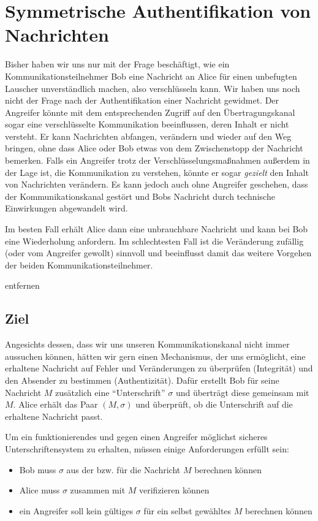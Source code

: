 \chapter{Symmetrische Authentifikation von Nachrichten}
\label{cha:symauth}

Bisher haben wir uns nur mit der Frage beschäftigt, wie ein
Kommunikationsteilnehmer Bob eine Nachricht an Alice für einen
unbefugten Lauscher unverständlich machen, also verschlüsseln kann. Wir
haben uns noch nicht der Frage nach der Authentifikation einer Nachricht
gewidmet.  Der Angreifer könnte mit dem entsprechenden Zugriff auf den
Übertragungskanal sogar eine verschlüsselte Kommunikation beeinflussen,
deren Inhalt er nicht versteht. Er kann Nachrichten abfangen, verändern
und wieder auf den Weg bringen, ohne dass Alice oder Bob etwas von dem
Zwischenstopp der Nachricht bemerken.  Falls ein Angreifer trotz der
Verschlüsselungsmaßnahmen außerdem in der Lage ist, die Kommunikation zu
verstehen, könnte er sogar \textit{gezielt} den Inhalt von Nachrichten
verändern.  Es kann jedoch auch ohne Angreifer geschehen, dass der
Kommunikationskanal gestört und Bobs Nachricht durch technische
Einwirkungen abgewandelt wird.

Im besten Fall erhält Alice dann eine unbrauchbare Nachricht und kann
bei Bob eine Wiederholung anfordern. Im schlechtesten Fall ist die
Veränderung zufällig (oder vom Angreifer gewollt) sinnvoll und
beeinflusst damit das weitere Vorgehen der beiden
Kommunikationsteilnehmer.

entfernen
\section{Ziel} Angesichts dessen, dass wir uns unseren
Kommunikationskanal nicht immer aussuchen können, hätten wir gern einen
Mechanismus, der uns ermöglicht, eine erhaltene Nachricht auf Fehler und
Veränderungen zu überprüfen (Integrität) und den Absender zu bestimmen
(Authentizität). Dafür erstellt Bob für seine Nachricht $M$ zusätzlich
eine "`Unterschrift"' $\sigma$ und überträgt diese gemeinsam mit
$M$. Alice erhält das Paar $(M,\sigma)$ und überprüft, ob die
Unterschrift auf die erhaltene Nachricht passt.

Um ein funktionierendes und gegen einen Angreifer möglichst sicheres
Unterschriftensystem zu erhalten, müssen einige Anforderungen erfüllt
sein:
\begin{itemize}
\item Bob muss $\sigma$ aus der bzw. für die Nachricht $M$ berechnen
  können
\item Alice muss $\sigma$ zusammen mit $M$ verifizieren können
\item ein Angreifer soll kein gültiges $\sigma$ für ein selbst
  gewähltes $M$ berechnen können
\end{itemize}

